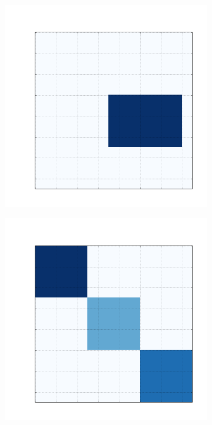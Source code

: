 \documentclass[
    12pt,                %
    oneside,            %
    a4paper,            %
    english,            %
    brazil                %
    ]{abntex2ppgsi}
\begin{document}
\begin{figure}[H]
    \begin{subfigure}[b]{0.18\textwidth}
        \includegraphics[width=\textwidth]{img/a-reconstruction-fnmtf.png}
        \caption{}
    \end{subfigure}
    \begin{subfigure}[b]{0.18\textwidth}
        \includegraphics[width=\textwidth]{img/b-reconstruction-fnmtf.png}

\end{subfigure}
\end{figure}
\end{document}
